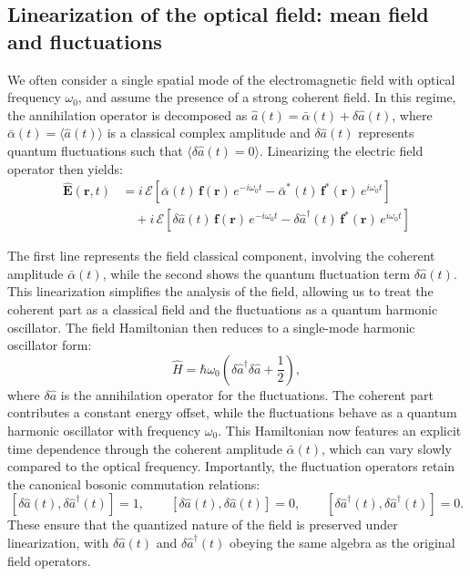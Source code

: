 \subsection*{Linearization of the optical field: mean field and fluctuations}

We often consider a single spatial mode of the electromagnetic field with optical frequency \(\omega_0\), and assume the presence of a strong coherent field. In this regime, the annihilation operator is decomposed as \(\hat{a}(t) = \bar{\alpha}(t) + \delta\hat{a}(t)\), where \(\bar{\alpha}(t)=\langle \hat{a}(t)\rangle\) is a classical complex amplitude and \(\delta\hat{a}(t)\) represents quantum fluctuations such that \(\langle \delta \hat{a}(t)=0\rangle\).
Linearizing the electric field operator then yields:
\begin{equation}
\begin{aligned}
\hat{\mathbf{E}}(\mathbf{r}, t) 
&= i \, \mathcal{E} \left[ \bar{\alpha}(t)\, \mathbf{f}(\mathbf{r})\, e^{-i \omega_0 t} 
- \bar{\alpha}^*(t)\, \mathbf{f}^*(\mathbf{r})\, e^{i \omega_0 t} \right] \\
&\quad + i \, \mathcal{E} \left[ \delta \hat{a}(t)\, \mathbf{f}(\mathbf{r})\, e^{-i \omega_0 t}
- \delta \hat{a}^\dagger(t)\, \mathbf{f}^*(\mathbf{r})\, e^{i \omega_0 t} \right]
\end{aligned}
\end{equation}

The first line represents the field classical component, involving the coherent amplitude $\bar{\alpha}(t)$, while the second shows the quantum fluctuation term $\delta\hat{a}(t)$. This linearization simplifies the analysis of the field, allowing us to treat the coherent part as a classical field and the fluctuations as a quantum harmonic oscillator. The field Hamiltonian then reduces to a single-mode harmonic oscillator form:
\begin{equation}
\hat{H} = \hbar \omega_0 \left( \delta \hat{a}^\dagger \delta \hat{a} + \frac{1}{2} \right),
\end{equation}
where $\delta \hat{a}$ is the annihilation operator for the fluctuations. The coherent part contributes a constant energy offset, while the fluctuations behave as a quantum harmonic oscillator with frequency $\omega_0$. This Hamiltonian now features an explicit time dependence through the coherent amplitude $\bar{\alpha}(t)$, which can vary slowly compared to the optical frequency.
Importantly, the fluctuation operators retain the canonical bosonic commutation relations:
\[
[\delta \hat{a}(t), \delta \hat{a}^\dagger(t)] = 1, \qquad
[\delta \hat{a}(t), \delta \hat{a}(t)] = 0, \qquad
[\delta \hat{a}^\dagger(t), \delta \hat{a}^\dagger(t)] = 0.
\]
These ensure that the quantized nature of the field is preserved under linearization, with $\delta \hat{a}(t)$ and $\delta \hat{a}^\dagger(t)$ obeying the same algebra as the original field operators. \\

